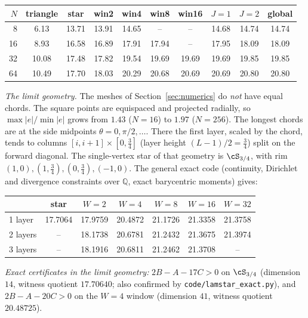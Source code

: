 \begin{center}\small
\begin{tabular}{rccccccccc}
\toprule
$N$ & triangle & star & win2 & win4 & win8 & win16 & $J=1$ & $J=2$ & global\\
\midrule
8 & 6.13 & 13.71 & 13.91 & 14.65 & -- & -- & 14.68 & 14.74 & 14.74\\
16 & 8.93 & 16.58 & 16.89 & 17.91 & 17.94 & -- & 17.95 & 18.09 & 18.09\\
32 & 10.08 & 17.48 & 17.82 & 19.54 & 19.69 & 19.69 & 19.69 & 19.85 & 19.85\\
64 & 10.49 & 17.70 & 18.03 & 20.29 & 20.68 & 20.69 & 20.69 & 20.80 & 20.80\\
\bottomrule
\end{tabular}
\end{center}

\emph{The limit geometry.} The meshes of Section~\ref{sec:numerics} do \emph{not} have equal chords. The square points are
equispaced and projected radially, so $\max|e|/\min|e|$ grows from $1.43$ ($N=16$) to $1.97$ ($N=256$). The longest chords
are at the side midpoints $\theta=0,\pi/2,\ldots$. There the first layer, scaled by the chord, tends to columns
$[i,i+1]\times[0,\frac34]$ (layer height $(L-1)/2=\frac34$) split on the forward diagonal. The single-vertex star of that
geometry is $\cS_{3/4}$, with rim $(1,0),(1,\frac34),(0,\frac34),(-1,0)$. The general exact code (continuity, Dirichlet and
divergence constraints over $\mathbb Q$, exact barycentric moments) gives:

\begin{center}\small
\begin{tabular}{lcccccc}
\toprule
 & star & $W=2$ & $W=4$ & $W=8$ & $W=16$ & $W=32$\\
\midrule
1 layer & 17.7064 & 17.9759 & 20.4872 & 21.1726 & 21.3358 & 21.3758\\
2 layers & -- & 18.1738 & 20.6781 & 21.2432 & 21.3675 & 21.3974\\
3 layers & -- & 18.1916 & 20.6811 & 21.2462 & 21.3708 & --\\
\bottomrule
\end{tabular}
\end{center}

\emph{Exact certificates in the limit geometry:} $2B-A-17C>0$ on $\cS_{3/4}$ (dimension $14$, witness quotient $17.70640$; also
confirmed by \texttt{code/lamstar\_exact.py}), and $2B-A-20C>0$ on the $W=4$ window (dimension $41$, witness quotient
$20.48725$).


